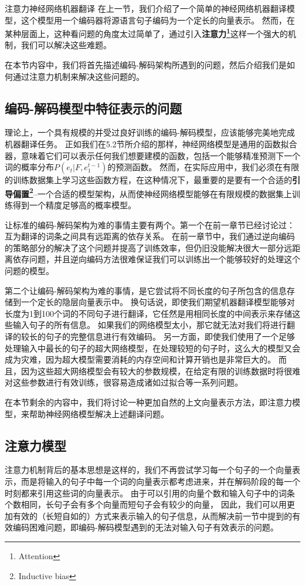 \documentclass[10pt,a4paper]{ctexart}
\makeatletter
\renewcommand{\section}{\@startsection{section}{1}{0mm}
  {-\baselineskip}{0.5\baselineskip}{\bf\leftline}}
\makeatother
\begin{document}
\newpage
\section{注意力神经网络机器翻译}
在上一节，我们介绍了一个简单的神经网络机器翻译模型，这个模型用一个编码器将源语言句子编码为一个定长的向量表示。
然而，在某种层面上，这种看问题的角度太过简单了，通过引入\textbf{注意力\footnote{Attention}}这样一个强大的机制，我们可以解决这些难题。

在本节内容中，我们将首先描述编码-解码架构所遇到的问题，然后介绍我们是如何通过注意力机制来解决这些问题的。

\subsection{编码-解码模型中特征表示的问题}
理论上，一个具有规模的并受过良好训练的编码-解码模型，应该能够完美地完成机器翻译任务。
正如我们在5.2节所介绍的那样，神经网络模型是通用的函数拟合器，意味着它们可以表示任何我们想要建模的函数，包括一个能够精准预测下一个词的概率分布$P(e_t | F,e_1^{t-1})$的预测函数。
然而，在实际应用中，我们必须在有限的训练数据集上学习这些函数方程，在这种情况下，最重要的是要有一个合适的\textbf{引导偏置\footnote{Inductive bias}}--一个合适的模型架构，从而使神经网络模型能够在有限规模的数据集上训练得到一个精度足够高的概率模型。

让标准的编码-解码架构为难的事情主要有两个。第一个在前一章节已经讨论过：互为翻译的词条之间具有远距离的依存关系。
在前一章节中，我们通过逆向编码的策略部分的解决了这个问题并提高了训练效率，但仍旧没能解决很大一部分远距离依存问题，并且逆向编码方法很难保证我们可以训练出一个能够较好的处理这个问题的模型。

第二个让编码-解码架构为难的事情，是它尝试将不同长度的句子所包含的信息存储到一个定长的隐层向量表示中。
换句话说，即使我们期望机器翻译模型能够对长度为1到100个词的不同句子进行翻译，它任然是用相同长度的中间表示来存储这些输入句子的所有信息。
如果我们的网络模型太小，那它就无法对我们将进行翻译的较长的句子的完整信息进行有效编码。
另一方面，即使我们使用了一个足够处理输入中最长的句子的超大网络模型，在处理较短的句子时，这么大的模型又会成为灾难，因为超大模型需要消耗的内存空间和计算开销也是非常巨大的。
而且，因为这些超大网络模型会有较大的参数规模，在给定有限的训练数据时将很难对这些参数进行有效训练，很容易造成诸如过拟合等一系列问题。

在本节剩余的内容中，我们将讨论一种更加自然的上文向量表示方法，即注意力模型，来帮助神经网络模型解决上述翻译问题。

\subsection{注意力模型}
注意力机制背后的基本思想是这样的，我们不再尝试学习每一个句子的一个向量表示，而是将输入的句子中每一个词的向量表示都考虑进来，并在解码阶段的每一个时刻都来引用这些词的向量表示。
由于可以引用的向量个数和输入句子中的词条个数相同，长句子会有多个向量而短句子会有较少的向量，
因此，我们可以用更加有效的（长短自如的）方式来表示输入的句子信息，从而解决前一节中提到的有效编码困难问题，即编码-解码模型遇到的无法对输入句子有效表示的问题。
\end{document}
